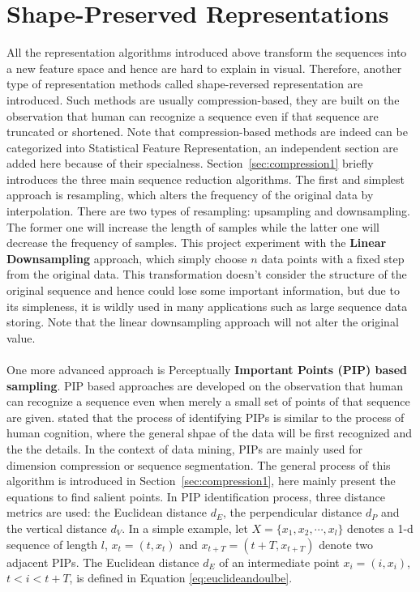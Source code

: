 \section{Shape-Preserved Representations}
\label{sec:pippaa}
All the representation algorithms introduced above transform the sequences into a new feature space and hence are hard to explain in visual. Therefore, another type of representation methods called shape-reversed representation are introduced. Such methods are usually compression-based, they are built on the observation that human can recognize a sequence even if that sequence are truncated or shortened. Note that compression-based methods are indeed can be categorized into Statistical Feature Representation, an independent section are added here because of their specialness. Section~\ref{sec:compression1} briefly introduces the three main sequence reduction algorithms. The first and simplest approach is resampling, which alters the frequency of the original data by interpolation. There are two types of resampling: upsampling and downsampling. The former one will increase the length of samples while the latter one will decrease the frequency of samples. This project experiment with the \textbf{Linear Downsampling} approach, which simply choose $n$ data points with a fixed step from the original data. This transformation doesn't consider the structure of the original sequence and hence could lose some important information, but due to its simpleness, it is wildly used in many applications such as large sequence data storing. Note that the linear downsampling approach will not alter the original value. \\
\\One more advanced approach is Perceptually \textbf{Important Points (PIP) based sampling}. PIP based approaches are developed on the observation that human can recognize a sequence even when merely a small set of points of that sequence are given. \cite{zaib2004pattern} stated that the process of identifying PIPs is similar to the process of human cognition, where the general shpae of the data will be first recognized and the the details. In the context of data mining, PIPs are mainly used for dimension compression or sequence segmentation. The general process of this algorithm is introduced in Section~\ref{sec:compression1}, here mainly present the equations to find salient points. In PIP identification process, three distance metrics are used: the Euclidean distance $d_E$, the perpendicular distance $d_P$ and the vertical distance $d_V$. In a simple example, let $X = \{x_1,x_2, \cdots, x_l\}$ denotes a 1-d sequence of length $l$, $x_t = (t, x_t)$ and $ x_{t+T} = (t+T,x_{t+T})$ denote two adjacent PIPs. The Euclidean distance $d_E$ of an intermediate point $x_i = (i, x_i)$, $t < i < t+T$, is defined in Equation \ref{eq:euclideandoulbe}. 
